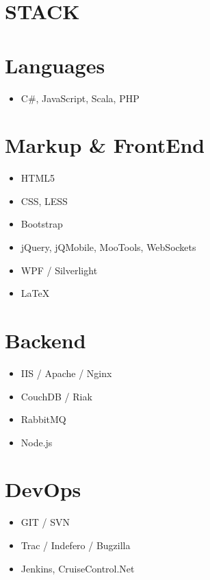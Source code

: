 \documentclass[margin]{res}
\begin{document}
\begin{resume}
\section{STACK} 
	\normalsize{\section{Languages}}
		\itemsep -2pt
 		\begin{itemize}
 			\item C\#, JavaScript, Scala, PHP
		\end{itemize}
	\normalsize{\section{Markup \& FrontEnd}}
		\itemsep -2pt
		\begin{itemize}
			\item HTML5
			\item CSS, LESS
			\item Bootstrap
			\item jQuery, jQMobile, MooTools, WebSockets
			\item WPF / Silverlight
			\item \LaTeX
		\end{itemize}
	\normalsize{\section{Backend}}
		\begin{itemize}
			\item IIS / Apache / Nginx
			\item CouchDB / Riak
			\item RabbitMQ
			\item Node.js
		\end{itemize}
	\normalsize{\section{DevOps}}
		\begin{itemize}
			\item GIT / SVN
			\item Trac / Indefero / Bugzilla
			\item Jenkins, CruiseControl.Net
		\end{itemize}
\newpage

\end{resume}
\end{document}
